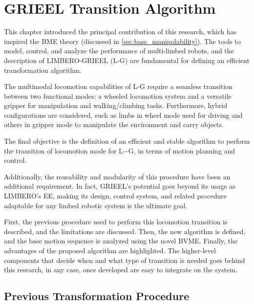 \chapter{GRIEEL Transition Algorithm}
\label{ch:chapter_five}%

This chapter introduced the principal contribution of this research, which has inspired the BME theory (discussed in \ref{sec:base_manipolability}). 
The tools to model, control, and analyze the performance of multi-limbed robots, and the description of LIMBERO-GRIEEL (L-G) are fundamental for defining an efficient transformation algorithm.

The multimodal locomotion capabilities of L-G require a seamless transition between two functional modes:  a wheeled locomotion system and a versatile gripper for manipulation and walking/climbing tasks.
Furthermore, hybrid configurations are considered, such as limbs in wheel mode used for driving and others in gripper mode to manipulate the environment and carry objects. 

The final objective is the definition of an efficient and stable algorithm to perform the transition of locomotion mode for L$-$G, in terms of motion planning and control. 

Additionally, the reusability and modularity of this procedure have been an additional requirement. 
In fact, GRIEEL's potential goes beyond its usage as LIMBERO's EE, making its design, control system, and related procedure adaptable for any limbed robotic system is the ultimate goal.   

First, the previous procedure used to perform this locomotion transition is described, and the limitations are discussed. 
Then, the new algorithm is defined, and the base motion sequence is analyzed using the novel BVME. 
Finally, the advantages of the proposed algorithm are highlighted. 
The higher-level components that decide when and what type of transition is needed goes behind this research, in any case, once developed are easy to integrate on the system. 

\section{Previous Transformation Procedure}
\label{sec:old_algorithm}

